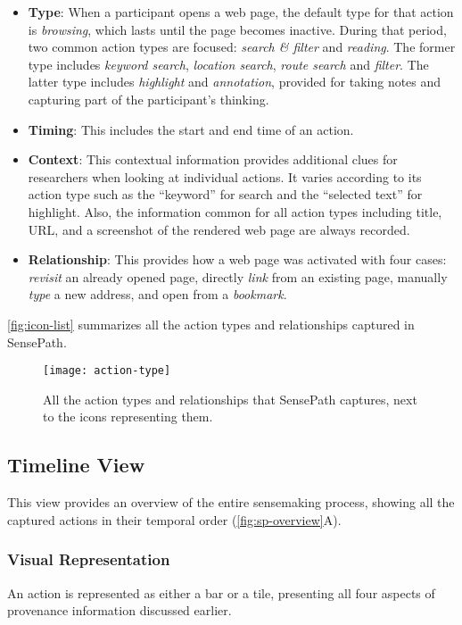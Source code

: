 \begin{itemize}
	\item \textbf{Type}: When a participant opens a web page, the default type for that action is \emph{browsing}, which lasts until the page becomes inactive. During that period, two common action types are focused: \emph{search \& filter} and \emph{reading}. The former type includes \emph{keyword search}, \emph{location search}, \emph{route search} and \emph{filter}. The latter type includes \emph{highlight} and \emph{annotation}, provided for taking notes and capturing part of the participant's thinking.

	\item \textbf{Timing}: This includes the start and end time of an action.

	\item \textbf{Context}: This contextual information provides additional clues for researchers when looking at individual actions. It varies according to its action type such as the ``keyword'' for search and the ``selected text'' for highlight. Also, the information common for all action types including title, URL, and a screenshot of the rendered web page are always recorded.

	\item \textbf{Relationship}: This provides how a web page was activated with four cases: \emph{revisit} an already opened page, directly \textit{link} from an existing page, manually \textit{type} a new address, and open from a \emph{bookmark}.
\end{itemize}

\autoref{fig:icon-list} summarizes all the action types and relationships captured in SensePath.

\begin{figure}[!htb]
	\centering
	\texttt{[image: action-type]}
	\caption{All the action types and relationships that SensePath captures, next to the icons representing them.}
	\label{fig:icon-list}
\end{figure}

\subsection{Timeline View}
This view provides an overview of the entire sensemaking process, showing all the captured actions in their temporal order (\autoref{fig:sp-overview}A).

\subsubsection{Visual Representation}
An action is represented as either a bar or a tile, presenting all four aspects of provenance information discussed earlier.

